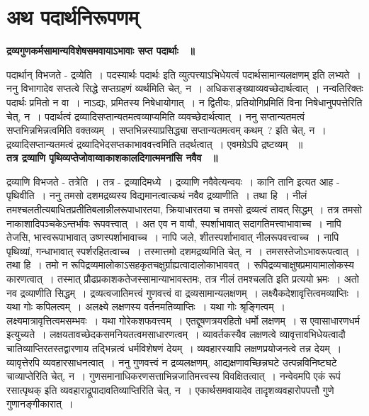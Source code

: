 \section*{अथ पदार्थनिरूपणम्}
	{\bfseries द्रव्यगुणकर्मसामान्यविशेषसमवायाऽभावाः सप्त पदार्थाः ~॥}\par
		पदार्थान् विभजते - द्रव्येति~। पदस्यार्थः पदार्थः इति व्युत्पत्त्याऽभिधेयत्वं पदार्थसामान्यलक्षणम् इति लभ्यते~। ननु विभागादेव सप्तत्वे सिद्धे सप्तग्रहणं व्यर्थमिति चेत्, न~। अधिकसङ्ख्याव्यवच्छेदार्थत्वात्~। नन्वतिरिक्तः पदार्थः प्रमितो न वा~। नाऽद्यः, प्रमितस्य निषेधायोगात्~। न द्वितीयः, प्रतियोगिप्रमितिं विना निषेधानुपपत्तेरिति चेत्, न~। पदार्थत्वं द्रव्यादिसप्तान्यतमत्वव्याप्यमिति व्यवच्छेदार्थत्वात्~। ननु सप्तान्यतमत्वं सप्तभिन्नभिन्नत्वमिति वक्तव्यम्~। सप्तभिन्नस्याप्रसिद्ध्या सप्तान्यतमत्वम् कथम्~? इति चेत्, न~। द्रव्यादिसप्तान्यतमत्वं द्रव्यादिभेदसप्तकाभाववत्त्वमिति तदर्थत्वात्~। एवमग्रेऽपि द्रष्टव्यम् ~॥\\[10pt]
	{\bfseries तत्र द्रव्याणि पृथिव्यप्तेजोवाय्वाकाशकालदिगात्ममनांसि नवैव ~॥}\par
		द्रव्याणि विभजते - तत्रेति~। तत्र - द्रव्यादिमध्ये~। द्रव्याणि नवैवेत्यन्वयः~। कानि तानि इत्यत आह - पृथिवीति~। ननु तमसो दशमद्रव्यस्य विद्यमानत्वात्कथं नवैव द्रव्याणीति~। तथा हि~। नीलं तमश्चलतीत्यबाधितप्रतीतिबलान्नीलरूपाधारतया, क्रियाधारतया च तमसो द्रव्यत्वं तावत् सिद्धम्~। तत्र तमसो नाकाशादिपञ्चकेऽन्तर्भावः रूपवत्त्वात्~। अत एव न वायौ, स्पर्शाभावात् सदागतिमत्त्वाभावाच्च~। नापि तेजसि, भास्वरूपाभावात् उष्णस्पर्शाभावाच्च~। नापि जले, शीतस्पर्शाभावात् नीलरूपवत्त्वाच्च~। नापि पृथिव्यां, गन्धाभावात् स्पर्शरहितत्वाच्च~। तस्मात्तमो दशमद्रव्यमिति चेत्, न~। तमसस्तेजोऽभावरूपत्वात्~। तथा हि~। तमो न रूपिद्रव्यमालोकाऽसहकृतचक्षुर्ग्राह्यत्वादालोकाभाववत्~। रूपिद्रव्यचाक्षुषप्रमायामालोकस्य कारणत्वात्~। तस्मात् प्रौढप्रकाशकतेजस्सामान्याभावस्तमः, तत्र नीलं तमश्चलति इति प्रत्ययो भ्रमः~। अतो नव द्रव्याणीति सिद्धम्~। द्रव्यत्वजातिमत्त्वं गुणवत्त्वं वा द्रव्यसामान्यलक्षणम्~। लक्ष्यैकदेशावृत्तित्वमव्याप्तिः~। यथा गोः कपिलत्वम्~। अलक्ष्ये लक्षणस्य वर्तनमतिव्याप्तिः~। यथा गोः श्रृङ्गित्वम्~। लक्ष्यमात्रावृत्तित्वमसम्भवः~। यथा गोरेकशफवत्त्वम्~। एतद्दूषणत्रयरहितो धर्मो लक्षणम्~। स एवासाधारणधर्म इत्युच्यते~। लक्षयतावच्छेदकसमनियतत्वमसाधारणत्वम्~। व्यावर्तकस्यैव लक्षणत्वे व्यावृत्तावभिधेयत्वादौ चातिव्याप्तिरतस्तद्वारणाय तद्भिन्नत्वं धर्मविशेषणं देयम्~। व्यवहारस्यापि लक्षणप्रयोजनत्वे तन्न देयम्~। व्यावृत्तेरपि व्यवहारसाधनत्वात्~। ननु गुणवत्त्वं न द्रव्यलक्षणम्, आद्यक्षणावच्छिन्नघटे उत्पन्नविनिष्टघटे चाव्याप्तेरिति चेत्, न~। गुणसमानाधिकरणसत्ताभिन्नजातिमत्त्वस्य विवक्षितत्वात्~। नन्वेवमपि एकं रूपं रसात्पृथक् इति व्यवहाराद्रूपादावतिव्याप्तिरिति चेत्, न~। एकार्थसमवायादेव तादृशव्यवहारोपपत्तौ गुणे गुणानङ्गीकारात्~।\\[10pt]
